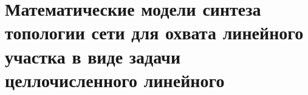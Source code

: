 \chapter{Математические модели синтеза топологии сети для охвата линейного участка в виде задачи целлочисленного линейного}\label{ch:ch3}






